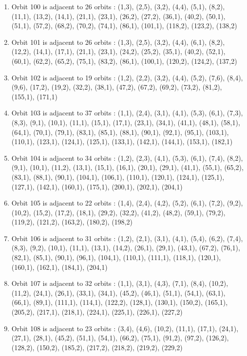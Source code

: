 \documentclass[12pt]{article}
\begin{document}
\begin{enumerate}
\item Orbit 100 is adjacent to 26 orbits : (1,3), (2,5), (3,2), (4,4), (5,1), (8,2), (11,1), (13,2), (14,1), (21,1), (23,1), (26,2), (27,2), (36,1), (40,2), (50,1), (51,1), (57,2), (68,2), (70,2), (74,1), (86,1), (101,1), (118,2), (123,2), (138,2)
\item Orbit 101 is adjacent to 26 orbits : (1,3), (2,5), (3,2), (4,4), (6,1), (8,2), (12,2), (14,1), (17,1), (21,1), (23,1), (24,2), (25,2), (35,1), (40,2), (52,1), (60,1), (62,2), (65,2), (75,1), (83,2), (86,1), (100,1), (120,2), (124,2), (137,2)
\item Orbit 102 is adjacent to 19 orbits : (1,2), (2,2), (3,2), (4,4), (5,2), (7,6), (8,4), (9,6), (17,2), (19,2), (32,2), (38,1), (47,2), (67,2), (69,2), (73,2), (81,2), (155,1), (171,1)
\item Orbit 103 is adjacent to 37 orbits : (1,1), (2,4), (3,1), (4,1), (5,3), (6,1), (7,3), (8,3), (9,1), (10,1), (11,1), (15,1), (17,1), (23,1), (34,1), (41,1), (48,1), (58,1), (64,1), (70,1), (79,1), (83,1), (85,1), (88,1), (90,1), (92,1), (95,1), (103,1), (110,1), (123,1), (124,1), (125,1), (133,1), (142,1), (144,1), (153,1), (182,1)
\item Orbit 104 is adjacent to 34 orbits : (1,2), (2,3), (4,1), (5,3), (6,1), (7,4), (8,2), (9,1), (10,1), (11,2), (13,1), (15,1), (16,1), (20,1), (29,1), (41,1), (55,1), (65,2), (83,1), (88,1), (90,1), (104,1), (106,1), (110,1), (120,1), (124,1), (125,1), (127,1), (142,1), (160,1), (175,1), (200,1), (202,1), (204,1)
\item Orbit 105 is adjacent to 22 orbits : (1,4), (2,4), (4,2), (5,2), (6,1), (7,2), (9,2), (10,2), (15,2), (17,2), (18,1), (29,2), (32,2), (41,2), (48,2), (59,1), (79,2), (119,2), (121,2), (163,2), (180,2), (198,2)
\item Orbit 106 is adjacent to 31 orbits : (1,2), (2,1), (3,1), (4,1), (5,4), (6,2), (7,4), (8,3), (9,2), (10,1), (11,1), (13,1), (14,2), (26,1), (29,1), (43,1), (67,2), (76,1), (82,1), (85,1), (90,1), (96,1), (104,1), (110,1), (111,1), (118,1), (120,1), (160,1), (162,1), (184,1), (204,1)
\item Orbit 107 is adjacent to 32 orbits : (1,1), (3,1), (4,3), (7,1), (8,4), (10,2), (11,2), (24,1), (26,1), (33,1), (34,1), (45,2), (46,1), (51,1), (54,1), (63,1), (66,1), (89,1), (111,1), (114,1), (122,2), (128,1), (130,1), (150,2), (165,1), (205,2), (217,1), (218,1), (224,1), (225,1), (226,1), (227,2)
\item Orbit 108 is adjacent to 23 orbits : (3,4), (4,6), (10,2), (11,1), (17,1), (24,1), (27,1), (28,1), (45,2), (51,1), (54,1), (66,2), (75,1), (91,2), (97,2), (126,2), (128,2), (150,2), (185,2), (217,2), (218,2), (219,2), (229,2)

\end{enumerate}
\end{document}
